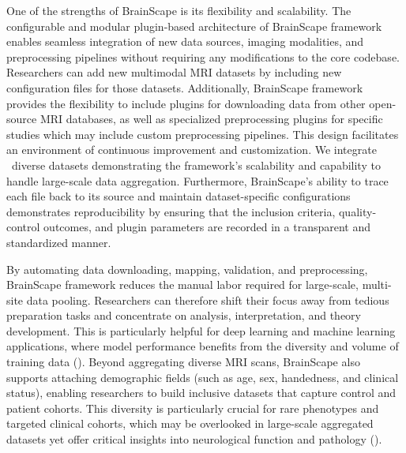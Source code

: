 One of the strengths of BrainScape is its flexibility and scalability. 
The configurable and modular plugin-based architecture of BrainScape framework enables 
seamless integration of new data sources, imaging modalities, and preprocessing pipelines without requiring any modifications to the core codebase.
Researchers can add new multimodal MRI datasets by including new configuration files for those datasets.
Additionally, BrainScape framework provides the flexibility to include plugins for downloading data from other open-source MRI databases, 
as well as specialized preprocessing plugins for specific studies which may include custom preprocessing pipelines.
This design facilitates an environment of continuous improvement and customization.
We integrate \NumDatasets\ diverse datasets demonstrating the framework's scalability 
and capability to handle large-scale data aggregation.
Furthermore, BrainScape's ability to trace each file back to its source and maintain 
dataset-specific configurations demonstrates reproducibility by ensuring that the inclusion criteria, 
quality-control outcomes, and plugin parameters are recorded in a transparent and standardized manner.

By automating data downloading, mapping, validation, and preprocessing, BrainScape framework reduces the 
manual labor required for large-scale, multi-site data pooling. Researchers can therefore shift 
their focus away from tedious preparation tasks and concentrate on analysis, interpretation, and theory development. 
This is particularly helpful for deep learning and machine learning applications, where model 
performance benefits from the diversity and volume of training data (\cite{dishner2024survey}). Beyond aggregating diverse MRI scans, 
BrainScape also supports attaching demographic fields (such as age, sex, handedness, and clinical status), enabling 
researchers to build inclusive datasets that capture control and patient cohorts. 
This diversity is particularly crucial for rare phenotypes and targeted clinical cohorts, 
which may be overlooked in large-scale aggregated datasets yet offer critical insights into neurological function and pathology (\cite{thompson2014enigma}).

